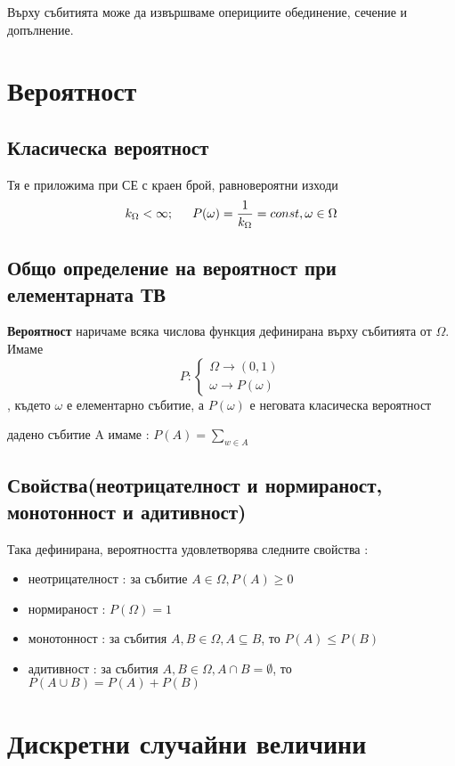 \documentclass[fleqn,12pt]{article}
\begin{document}
\begin{justify}
Върху събитията може да извършваме оперициите обединение, сечение и допълнение.

\section{Вероятност}
\subsection{Класическа вероятност}
Тя е приложима при СЕ с краен брой, равновероятни изходи
\begin{gather*}
    k_\Omega < \infty; \indent P(\omega) = \frac{1}{k_\Omega} = const, \omega \in \Omega
\end{gather*}
\subsection{Общо определение на вероятност при елементарната ТВ}
\textbf{Вероятност} наричаме всяка числова функция дефинирана върху събитията от $\Omega$. Имаме
\[P : \begin{cases}
    \Omega \rightarrow (0, 1)\\
    \omega \rightarrow P(\omega)
\end{cases}
\]
, където $\omega$ е елементарно събитие, а $P(\omega)$ е неговата класическа вероятност

 дадено събитие A имаме : $P(A) = \sum_{w \in A}$
    
\subsection{Свойства(неотрицателност и нормираност, монотонност и адитивност)}
Така дефинирана, вероятността удовлетворява следните свойства : 
\begin{itemize}
    \item неотрицателност : за събитие $A \in \Omega, P(A) \geq 0$
    \item нормираност : $P(\Omega) = 1$
    \item монотонност : за събития $A,B \in \Omega, A \subseteq B$, то $P(A) \leq P(B)$
    \item адитивност : за събития $A,B \in \Omega, A \cap B = \emptyset$, то $P(A \cup B) = P(A) + P(B)$
\end{itemize}

\section{Дискретни случайни величини}

\end{justify}
\end{document}
